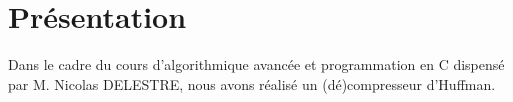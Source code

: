 \section{Présentation}

Dans le cadre du cours d'algorithmique avancée et programmation en C dispensé par M. Nicolas DELESTRE,
nous avons réalisé un (dé)compresseur d'Huffman.